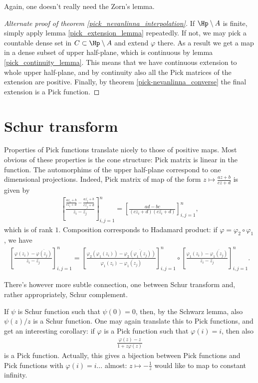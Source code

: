 Again, one doesn't really need the Zorn's lemma.

\begin{proof}[Alternate proof of theorem \ref{pick_nevanlinna_interpolation}]
	If $\Hp \setminus A$ is finite, simply apply lemma \ref{pick_extension_lemma} repeatedly. If not, we may pick a countable dense set in $C \subset \Hp \setminus A$ and extend $\varphi$ there. As a result we get a map in a dense subset of upper half-plane, which is continuous by lemma \ref{pick_continuity_lemma}. This means that we have continuous extension to whole upper half-plane, and by continuity also all the Pick matrices of the extension are positive. Finally, by theorem \ref{pick-nevanlinna_converse} the final extension is a Pick function.
\end{proof}

\section{Schur transform}

Properties of Pick functions translate nicely to those of positive maps. Most obvious of these properties is the cone structure: Pick matrix is linear in the function. The automorphims of the upper half-plane correspond to one dimensional projections. Indeed, Pick matrix of map of the form $z \mapsto \frac{a z + b}{c z + d}$ is given by
\begin{align*}
	\left[\frac{\frac{a z_{i} + b}{c z_{i} + d} - \frac{a \overline{z_{j}} + b}{c \overline{z_{j}} + d}}{z_{i} - \overline{z_{j}}}\right]_{i, j = 1}^{n}
	=
	\left[\frac{a d - bc}{(c z_{i} + d) (c \overline{z_{i}} + d)}\right]_{i, j = 1}^{n},
\end{align*}
which is of rank $1$. Composition corresponds to Hadamard product: if $\varphi = \varphi_{2} \circ \varphi_{1}$, we have
\begin{align*}
	\left[\frac{\varphi(z_{i}) - \overline{\varphi(z_{j})}}{z_{i} - \overline{z_{j}}}\right]_{i, j = 1}^{n}
	=
	\left[\frac{\varphi_{2}(\varphi_{1}(z_{i})) - \overline{\varphi_{2}(\varphi_{1}(z_{j}))}}{\varphi_{1}(z_{i}) - \overline{\varphi_{1}(z_{j})}}\right]_{i, j = 1}^{n}
	\circ
	\left[\frac{\varphi_{1}(z_{i}) - \overline{\varphi_{1}(z_{j})}}{z_{i} - \overline{z_{j}}}\right]_{i, j = 1}^{n}.
\end{align*}

There's however more subtle connection, one between Schur transform and, rather appropriately, Schur complement.

If $\psi$ is Schur function such that $\psi(0) = 0$, then, by the Schwarz lemma, also $\psi(z)/z$ is a Schur function. One may again translate this to Pick functions, and get an interesting corollary: if $\varphi$ is a Pick function such that $\varphi(i) = i$, then also
\begin{align*}
	\frac{\varphi(z) - z}{1 + z \varphi(z)}
\end{align*}
is a Pick function. Actually, this gives a bijection between Pick functions and Pick functions with $\varphi(i) = i \ldots$ almost: $z \mapsto -\frac{1}{z}$ would like to map to constant infinity.

